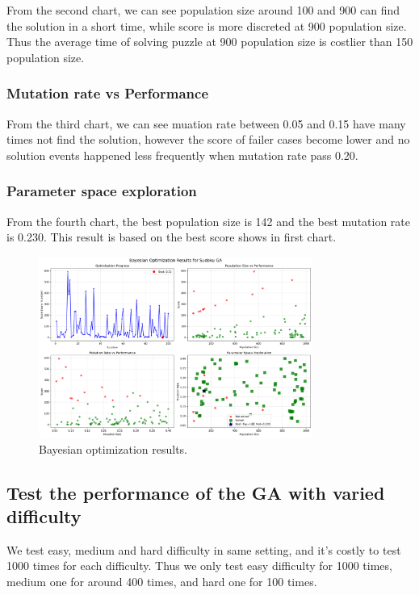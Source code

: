 From the second chart, we can see population size around 100 and 900 can find the solution in a short time, while score is more discreted at 900 population size. Thus the average time of solving puzzle at 900 population size is costlier than 150 population size.

\subsubsection{Mutation rate vs Performance}

From the third chart, we can see muation rate between 0.05 and 0.15 have many times not find the solution, however the score of failer cases become lower and no solution events happened less frequently when mutation rate pass 0.20.

\subsubsection{Parameter space exploration}

From the fourth chart, the best population size is 142 and the best mutation rate is 0.230. This result is based on the best score shows in first chart.

\begin{figure}[H]
\centering
\includegraphics[width=0.8\textwidth]{resources/bayesian_optimization_results.png}
\caption{Bayesian optimization results.}
\label{fig:bayesian_optimization_results}
\end{figure}

\subsection{Test the performance of the GA with varied difficulty}

We test easy, medium and hard difficulty in same setting, and it's costly to test 1000 times for each difficulty. Thus we only test easy difficulty for 1000 times, medium one for around 400 times, and hard one for 100 times.

